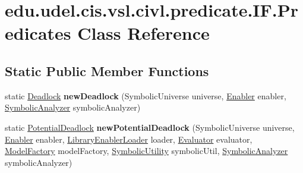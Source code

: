 \hypertarget{classedu_1_1udel_1_1cis_1_1vsl_1_1civl_1_1predicate_1_1IF_1_1Predicates}{}\section{edu.\+udel.\+cis.\+vsl.\+civl.\+predicate.\+I\+F.\+Predicates Class Reference}
\label{classedu_1_1udel_1_1cis_1_1vsl_1_1civl_1_1predicate_1_1IF_1_1Predicates}
\subsection*{Static Public Member Functions}
\begin{DoxyCompactItemize}
\item 
\hypertarget{classedu_1_1udel_1_1cis_1_1vsl_1_1civl_1_1predicate_1_1IF_1_1Predicates_a51f83c9278e1c1d5bb6bea27a25a02d2}{}static \hyperlink{interfaceedu_1_1udel_1_1cis_1_1vsl_1_1civl_1_1predicate_1_1IF_1_1Deadlock}{Deadlock} {\bfseries new\+Deadlock} (Symbolic\+Universe universe, \hyperlink{interfaceedu_1_1udel_1_1cis_1_1vsl_1_1civl_1_1kripke_1_1IF_1_1Enabler}{Enabler} enabler, \hyperlink{interfaceedu_1_1udel_1_1cis_1_1vsl_1_1civl_1_1semantics_1_1IF_1_1SymbolicAnalyzer}{Symbolic\+Analyzer} symbolic\+Analyzer)\label{classedu_1_1udel_1_1cis_1_1vsl_1_1civl_1_1predicate_1_1IF_1_1Predicates_a51f83c9278e1c1d5bb6bea27a25a02d2}

\item 
\hypertarget{classedu_1_1udel_1_1cis_1_1vsl_1_1civl_1_1predicate_1_1IF_1_1Predicates_ad45683e7a34f3cc956137471350da5a0}{}static \hyperlink{interfaceedu_1_1udel_1_1cis_1_1vsl_1_1civl_1_1predicate_1_1IF_1_1PotentialDeadlock}{Potential\+Deadlock} {\bfseries new\+Potential\+Deadlock} (Symbolic\+Universe universe, \hyperlink{interfaceedu_1_1udel_1_1cis_1_1vsl_1_1civl_1_1kripke_1_1IF_1_1Enabler}{Enabler} enabler, \hyperlink{interfaceedu_1_1udel_1_1cis_1_1vsl_1_1civl_1_1kripke_1_1IF_1_1LibraryEnablerLoader}{Library\+Enabler\+Loader} loader, \hyperlink{interfaceedu_1_1udel_1_1cis_1_1vsl_1_1civl_1_1semantics_1_1IF_1_1Evaluator}{Evaluator} evaluator, \hyperlink{interfaceedu_1_1udel_1_1cis_1_1vsl_1_1civl_1_1model_1_1IF_1_1ModelFactory}{Model\+Factory} model\+Factory, \hyperlink{interfaceedu_1_1udel_1_1cis_1_1vsl_1_1civl_1_1dynamic_1_1IF_1_1SymbolicUtility}{Symbolic\+Utility} symbolic\+Util, \hyperlink{interfaceedu_1_1udel_1_1cis_1_1vsl_1_1civl_1_1semantics_1_1IF_1_1SymbolicAnalyzer}{Symbolic\+Analyzer} symbolic\+Analyzer)\label{classedu_1_1udel_1_1cis_1_1vsl_1_1civl_1_1predicate_1_1IF_1_1Predicates_ad45683e7a34f3cc956137471350da5a0}


\end{DoxyCompactItemize}
